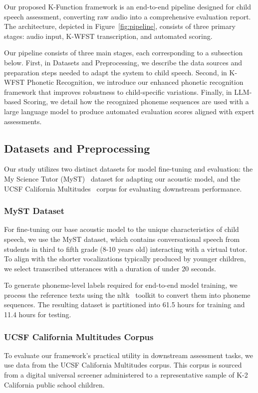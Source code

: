 

Our proposed K-Function framework is an end-to-end pipeline designed for child speech assessment, converting raw audio into a comprehensive evaluation report. The architecture, depicted in Figure~\ref{fig:pipeline}, consists of three primary stages: audio input, K-WFST transcription, and automated scoring. 


Our pipeline consists of three main stages, each corresponding to a subsection below. First, in Datasets and Preprocessing, we describe the data sources and preparation steps needed to adapt the system to child speech. Second, in K-WFST Phonetic Recognition, we introduce our enhanced phonetic recognition framework that improves robustness to child-specific variations. Finally, in LLM-based Scoring, we detail how the recognized phoneme sequences are used with a large language model to produce automated evaluation scores aligned with expert assessments.

\subsection{Datasets and Preprocessing}
Our study utilizes two distinct datasets for model fine-tuning and evaluation: the My Science Tutor (MyST)~\cite{ward2011my} dataset for adapting our acoustic model, and the UCSF California Multitudes~\cite{UCSFMultitudes2025} corpus  for evaluating downstream performance.


\subsubsection{MyST Dataset}
For fine-tuning our base acoustic model to the unique characteristics of child speech, we use the MyST dataset, which contains conversational speech from students in third to fifth grade (8-10 years old) interacting with a virtual tutor. To align with the shorter vocalizations typically produced by younger children, we select transcribed utterances with a duration of under 20 seconds.

To generate phoneme-level labels required for end-to-end model training, we process the reference texts using the nltk~\cite{bird2009natural} toolkit to convert them into phoneme sequences. The resulting dataset is partitioned into 61.5 hours for training and 11.4 hours for testing.

\subsubsection{UCSF California Multitudes Corpus}
To evaluate our framework's practical utility in downstream assessment tasks, we use data from the UCSF California Multitudes corpus. This corpus is sourced from a digital universal screener administered to a representative sample of K-2 California public school children.

